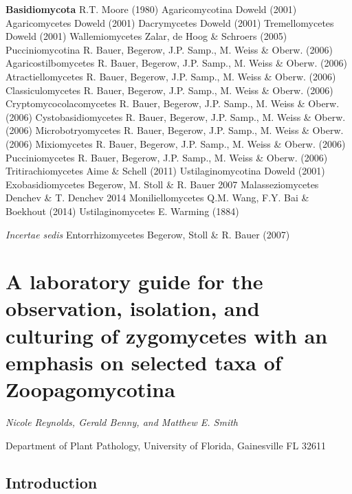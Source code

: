 \documentclass[]{book}
\begin{document}
\textbf{Basidiomycota} R.T. Moore (1980) Agaricomycotina Doweld (2001)
Agaricomycetes Doweld (2001) Dacrymycetes Doweld (2001) Tremellomycetes
Doweld (2001) Wallemiomycetes Zalar, de Hoog \& Schroers (2005)
Pucciniomycotina R. Bauer, Begerow, J.P. Samp., M. Weiss \& Oberw.
(2006) Agaricostilbomycetes R. Bauer, Begerow, J.P. Samp., M. Weiss \&
Oberw. (2006) Atractiellomycetes R. Bauer, Begerow, J.P. Samp., M. Weiss
\& Oberw. (2006) Classiculomycetes R. Bauer, Begerow, J.P. Samp., M.
Weiss \& Oberw. (2006) Cryptomycocolacomycetes R. Bauer, Begerow, J.P.
Samp., M. Weiss \& Oberw. (2006) Cystobasidiomycetes R. Bauer, Begerow,
J.P. Samp., M. Weiss \& Oberw. (2006) Microbotryomycetes R. Bauer,
Begerow, J.P. Samp., M. Weiss \& Oberw. (2006) Mixiomycetes R. Bauer,
Begerow, J.P. Samp., M. Weiss \& Oberw. (2006) Pucciniomycetes R. Bauer,
Begerow, J.P. Samp., M. Weiss \& Oberw. (2006) Tritirachiomycetes Aime
\& Schell (2011) Ustilaginomycotina Doweld (2001) Exobasidiomycetes
Begerow, M. Stoll \& R. Bauer 2007 Malasseziomycetes Denchev \& T.
Denchev 2014 Moniliellomycetes Q.M. Wang, F.Y. Bai \& Boekhout (2014)
Ustilaginomycetes E. Warming (1884)

\emph{Incertae sedis} Entorrhizomycetes Begerow, Stoll \& R. Bauer
(2007)

\chapter{A laboratory guide for the observation, isolation, and
culturing of zygomycetes with an emphasis on selected taxa of
Zoopagomycotina}\label{lab_zoopago}

\emph{Nicole Reynolds, Gerald Benny, and Matthew E. Smith}

Department of Plant Pathology, University of Florida, Gainesville FL
32611

\section{Introduction}\label{introduction}
\end{document}
